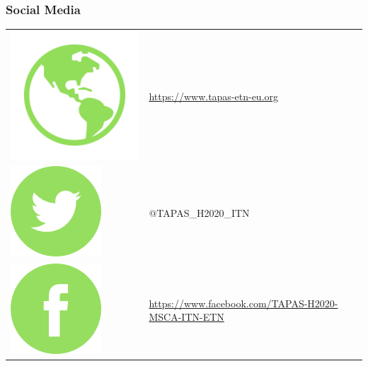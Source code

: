 \documentclass{beamer}
\begin{document}
\begin{frame}
\frametitle{Social Media}
\small
\begin{tabular}{ll}
\hspace{-0.1cm}\includegraphics[scale=0.4]{img/website.png} & \url{https://www.tapas-etn-eu.org}\vspace{0.3cm}\\ 
\includegraphics{img/twitter.png} & @TAPAS\_H2020\_ITN\vspace{0.4cm}\\
\includegraphics{img/facebook.png} & \url{https://www.facebook.com/TAPAS-H2020-MSCA-ITN-ETN}
\end{tabular}
\end{frame}
\end{document}
